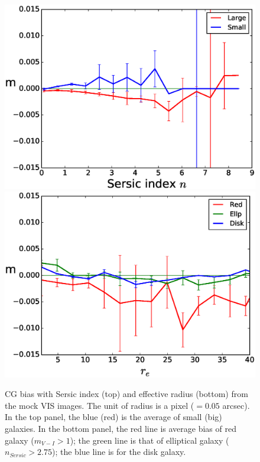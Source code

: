 \documentclass[useAMS,usenatbib]{mnras}
\begin{document}
\begin{figure}
\includegraphics[width=\hsize]{z2s-ne17.eps}
\includegraphics[width=\hsize]{z2nscl-re17.eps}
\caption{CG bias with Sersic index (top) and effective radius (bottom)
  from the mock VIS images. The unit of radius is a pixel ($=0.05$
  arcsec). In the top panel, the blue (red) is the average of small
  (big) galaxies. In the bottom panel, the red line is average bias of
  red galaxy ($m_{V-I}>1$); the green line is that of elliptical
  galaxy ($n_{Sersic}>2.75$); the blue line is for the disk galaxy.}
\label{fig:cg2re}
\end{figure}
%
\end{document}
